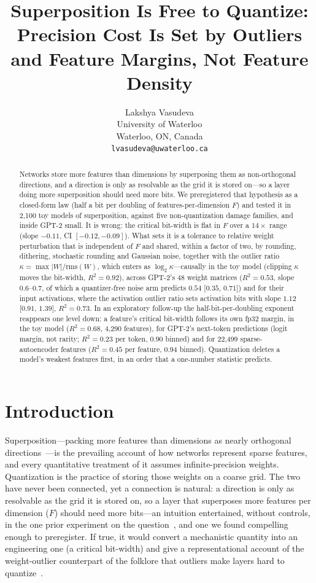 \documentclass{article}
\title{Superposition Is Free to Quantize: Precision Cost Is Set by Outliers and Feature Margins, Not Feature Density}
\author{Lakshya Vasudeva \\ University of Waterloo \\ Waterloo, ON, Canada \\ \texttt{lvasudeva@uwaterloo.ca}}
\begin{document}
\maketitle

\begin{abstract}
Networks store more features than dimensions by superposing them as non-orthogonal directions, and a direction is only
as resolvable as the grid it is stored on---so a layer doing more superposition should need more bits. We preregistered
that hypothesis as a closed-form law (half a bit per doubling of features-per-dimension $F$) and tested it in 2{,}100
toy models of superposition, against five non-quantization damage families, and inside GPT-2 small. It is wrong:
the critical bit-width is flat in $F$ over a $14\times$ range (slope $-0.11$, CI $[-0.12,-0.09]$). What sets it is a
tolerance to relative weight perturbation that is independent of $F$ and shared, within a factor of two, by rounding,
dithering, stochastic rounding and Gaussian noise, together with the outlier ratio $\kappa=\max|W|/\mathrm{rms}(W)$, which
enters as $\log_2\kappa$---causally in the toy model (clipping $\kappa$ moves the bit-width, $R^2=0.92$), across GPT-2's 48 weight matrices
($R^2=0.53$, slope $0.6$--$0.7$, of which a quantizer-free noise arm predicts $0.54$ [$0.35$, $0.71$]) and for their input
activations, where the activation outlier ratio sets activation bits with slope $1.12$ [$0.91$, $1.39$], $R^2=0.73$. In an exploratory follow-up the half-bit-per-doubling exponent reappears one level down: a feature's critical
bit-width follows its own fp32 margin, in the toy model ($R^2=0.68$, 4{,}290 features), for GPT-2's next-token predictions
(logit margin, not rarity; $R^2 = 0.23$ per token, $0.90$ binned) and for 22{,}499 sparse-autoencoder features ($R^2=0.45$
per feature, $0.94$ binned). Quantization deletes a model's weakest features first, in an order that a one-number
statistic predicts.
\end{abstract}

\section{Introduction}
Superposition---packing more features than dimensions as nearly orthogonal directions~\cite{elhage2022toy}---is the
prevailing account of how networks represent sparse features, and every quantitative treatment of it assumes
infinite-precision weights. Quantization is the practice of storing those weights on a coarse grid. The two have never
been connected, yet a connection is natural: a direction is only as resolvable as the grid it is stored on, so a layer
that superposes more features per dimension ($F$) should need more bits---an intuition entertained, without controls, in
the one prior experiment on the question~\cite{bitnets}, and one we found compelling enough to preregister. If true, it
would convert a mechanistic quantity into an engineering one (a critical bit-width) and give a representational account
of the weight-outlier counterpart of the folklore that outliers make layers hard to quantize~\cite{dettmers2022,xiao2023,lin2024awq}.
\end{document}
